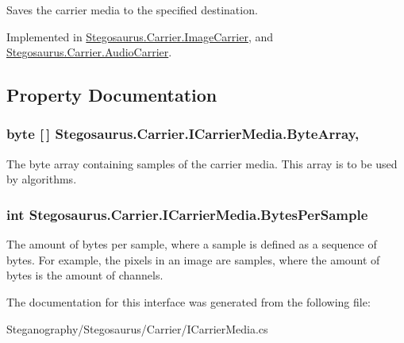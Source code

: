 Saves the carrier media to the specified destination. 



Implemented in \hyperlink{class_stegosaurus_1_1_carrier_1_1_image_carrier_a6a5a9c575f2ce202512fd99f6cabd0a3}{Stegosaurus.\+Carrier.\+Image\+Carrier}, and \hyperlink{class_stegosaurus_1_1_carrier_1_1_audio_carrier_ac703d4709853222c6dcc98d12f6c9130}{Stegosaurus.\+Carrier.\+Audio\+Carrier}.



\subsection{Property Documentation}
\subsubsection[{\texorpdfstring{Byte\+Array}{ByteArray}}]{\setlength{\rightskip}{0pt plus 5cm}byte \mbox{[}$\,$\mbox{]} Stegosaurus.\+Carrier.\+I\+Carrier\+Media.\+Byte\+Array\hspace{0.3cm}{\ttfamily [get]}, {\ttfamily [set]}}\hypertarget{interface_stegosaurus_1_1_carrier_1_1_i_carrier_media_a2ca3c8f4deb980992f5855c9c8653c91}{}\label{interface_stegosaurus_1_1_carrier_1_1_i_carrier_media_a2ca3c8f4deb980992f5855c9c8653c91}


The byte array containing samples of the carrier media. This array is to be used by algorithms. 

\subsubsection[{\texorpdfstring{Bytes\+Per\+Sample}{BytesPerSample}}]{\setlength{\rightskip}{0pt plus 5cm}int Stegosaurus.\+Carrier.\+I\+Carrier\+Media.\+Bytes\+Per\+Sample\hspace{0.3cm}{\ttfamily [get]}}\hypertarget{interface_stegosaurus_1_1_carrier_1_1_i_carrier_media_a53803a5166184ac2a6dc99000c3cbae6}{}\label{interface_stegosaurus_1_1_carrier_1_1_i_carrier_media_a53803a5166184ac2a6dc99000c3cbae6}


The amount of bytes per sample, where a sample is defined as a sequence of bytes. For example, the pixels in an image are samples, where the amount of bytes is the amount of channels. 



The documentation for this interface was generated from the following file\+:\begin{DoxyCompactItemize}
\item 
Steganography/\+Stegosaurus/\+Carrier/I\+Carrier\+Media.\+cs\end{DoxyCompactItemize}
